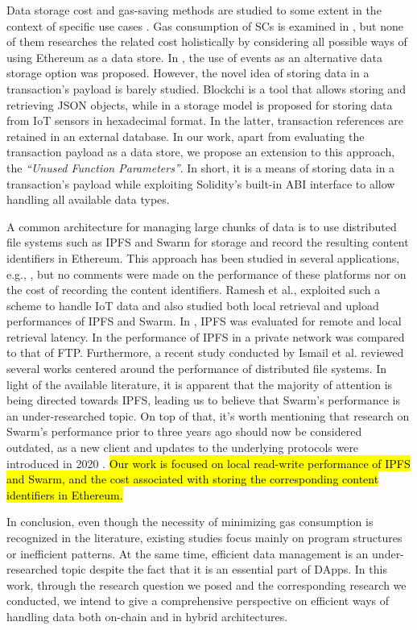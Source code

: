 Data storage cost and gas-saving methods are studied to some extent in the context of specific use cases  \citep{kurt_2020, delgado_2019, westerkamp_2020}. Gas consumption of SCs is examined in  \citep{grech_2020, signer_2018}, but none of them researches the related cost holistically by considering all possible ways of using Ethereum as a data store. In  \citep{consensys}, the use of events as an alternative data storage option was proposed. However, the novel idea of storing data in a transaction’s payload is barely studied. Blockchi \citep{yankov_2018} is a tool that allows storing and retrieving JSON objects, while in  \citep{xie_2017} a storage model is proposed for storing data from IoT sensors in hexadecimal format. In the latter, transaction references are retained in an external database. In our work, apart from evaluating the transaction payload as a data store, we propose an extension to this approach, the \emph{``Unused Function Parameters''}. In short, it is a means of storing data in a transaction's payload while exploiting Solidity's built-in ABI interface to allow handling all available data types.

A common architecture for managing large chunks of data is to use distributed file systems such as IPFS and Swarm for storage and record the resulting content identifiers in Ethereum. This approach has been studied in several applications, e.g., \citep{hao_j_2018, ren_2021}, but no comments were made on the performance of these platforms nor on the cost of recording the content identifiers. Ramesh et al.\cite{ramesh_2019}, exploited such a scheme to handle IoT data and also studied both local retrieval and upload performances of IPFS and Swarm. In \citep{shen_2019}, IPFS was evaluated for remote and local retrieval latency. In \citep{abdullah_2021} the performance of IPFS in a private network was compared to that of FTP. Furthermore, a recent study conducted by Ismail et al. \cite{aisyah_2022} reviewed several works centered around the performance of distributed file systems. In light of the available literature, it is apparent that the majority of attention is being directed towards IPFS, leading us to believe that Swarm’s performance is an under-researched topic. On top of that, it's worth mentioning that research on Swarm's performance prior to three years ago should now be considered outdated, as a new client \citep{swarm_bee} and updates to the underlying protocols were introduced in 2020 \citep{tron_2020}. \hl{Our work is focused on local read-write performance of IPFS and Swarm, and the cost associated with storing the corresponding content identifiers in Ethereum.}

In conclusion, even though the necessity of minimizing gas consumption is recognized in the literature, existing studies focus mainly on program structures or inefficient patterns. At the same time, efficient data management is an under-researched topic despite the fact that it is an essential part of DApps. In this work, through the research question we posed and the corresponding research we conducted, we intend to give a comprehensive perspective on efficient ways of handling data both on-chain and in hybrid architectures.
